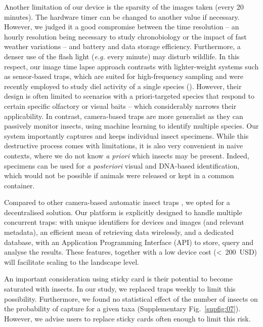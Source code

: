\documentclass[12pt]{article}
\begin{document}
\begin{linenumbers}
		
		Another limitation of our device is the sparsity of the images taken (every 20 minutes). The hardware timer can be changed to another value if necessary. However, we judged it a good compromise between the time resolution -- an hourly resolution being necessary to study chronobiology or the impact of fast weather variations -- and battery and data storage efficiency.
		Furthermore, a denser use of the flash light (\emph{e.g.} every minute) may disturb wildlife.		
		In this respect, our image time lapse approach contrasts with lighter-weight systems such as sensor-based traps, which are suited for high-frequency sampling and were recently employed to study diel activity of a single species (\cite{chen_flying_2014, goldshtein_long-term_2021}).
		However, their design is often limited to scenarios with a priori-targeted species that respond to certain specific olfactory or visual baits – which considerably narrows their applicability.
		In contrast, camera-based traps are more generalist as they can passively monitor insects, using machine learning to identify multiple species. Our system importantly captures and keeps individual insect specimens. While this destructive process comes with limitations, 
		it is also very convenient in naive contexts, where we do not know \emph{a priori} which insects may be present.
		Indeed, specimens can be used for \emph{a posteriori} visual and DNA-based identification, which would not be possible if animals were released or kept in a common container.
		
		Compared to other camera-based automatic insect traps \cite{bjerge_automated_2021}, we opted for a decentralised solution. 
		Our platform is explicitly designed to handle multiple concurrent traps: with unique identifiers for devices and images (and relevant metadata),
		an efficient mean of retrieving data wirelessly, and a dedicated database, with an Application Programming Interface (API) to store, query and analyse the results. These features, together with a low device cost (<~200~USD) will facilitate scaling to the landscape level.
		
		
		An important consideration using sticky card is their potential to become saturated with insects. 
		In our study, we replaced traps weekly to limit this possibility. 
		Furthermore, we found no statistical effect of the number of insects on the probability of capture for a given taxa
		(Supplementary Fig.~\ref{supfig:07}). However, we advise users to replace sticky cards often enough to limit this risk.
					

\end{linenumbers}
\end{document}
